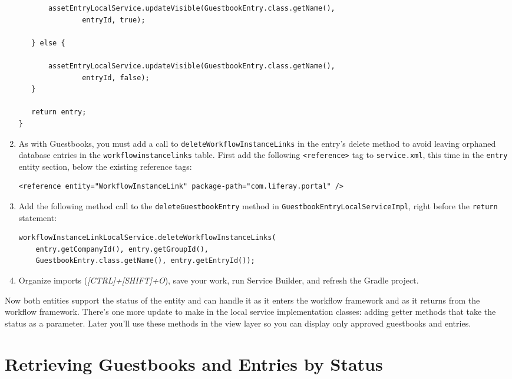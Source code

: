 \begin{enumerate}
\begin{verbatim}
       assetEntryLocalService.updateVisible(GuestbookEntry.class.getName(),
               entryId, true);

   } else {

       assetEntryLocalService.updateVisible(GuestbookEntry.class.getName(),
               entryId, false);
   }

   return entry;
}
\end{verbatim}
\item
  As with Guestbooks, you must add a call to
  \texttt{deleteWorkflowInstanceLinks} in the entry's delete method to
  avoid leaving orphaned database entries in the
  \texttt{workflowinstancelinks} table. First add the following
  \texttt{\textless{}reference\textgreater{}} tag to
  \texttt{service.xml}, this time in the \texttt{entry} entity section,
  below the existing reference tags:

\begin{verbatim}
<reference entity="WorkflowInstanceLink" package-path="com.liferay.portal" />
\end{verbatim}
\item
  Add the following method call to the \texttt{deleteGuestbookEntry}
  method in \texttt{GuestbookEntryLocalServiceImpl}, right before the
  \texttt{return} statement:

\begin{verbatim}
workflowInstanceLinkLocalService.deleteWorkflowInstanceLinks(
    entry.getCompanyId(), entry.getGroupId(),
    GuestbookEntry.class.getName(), entry.getEntryId());
\end{verbatim}
\item
  Organize imports (\emph{{[}CTRL{]}+{[}SHIFT{]}+O}), save your work,
  run Service Builder, and refresh the Gradle project.
\end{enumerate}

Now both entities support the status of the entity and can handle it as
it enters the workflow framework and as it returns from the workflow
framework. There's one more update to make in the local service
implementation classes: adding getter methods that take the status as a
parameter. Later you'll use these methods in the view layer so you can
display only approved guestbooks and entries.

\chapter{Retrieving Guestbooks and Entries by
Status}\label{retrieving-guestbooks-and-entries-by-status}

